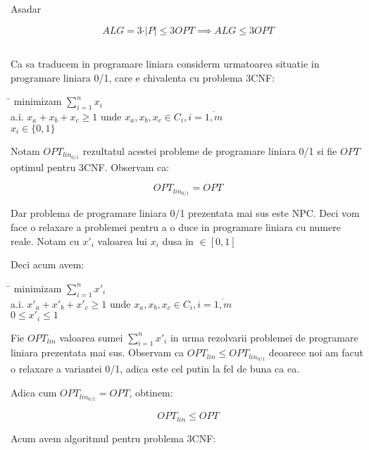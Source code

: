 \documentclass[a4paper]{report} %
\begin{document}
Asadar

\[ALG=3\cdot \vert P\vert \leq 3OPT \implies ALG\leq 3OPT\]

\subsection{}
Ca sa traducem in programare liniara considerm urmatoarea situatie in programare liniara 0/1, care e chivalenta cu problema 3CNF:

\begin{tabbing}
\hspace{2em}\= \kill 
minimizam $\sum_{i=1}^{n}x_{i}$ \\
a.i. \> $x_{a}+x_{b}+x_{c}\geq 1 \text{ unde } x_{a},x_{b},x_{c}\in C_{i}, i=\overline{1,m}$ \\
\> $x_{i}\in \{0, 1\}$
\end{tabbing}
Notam $OPT_{lin_{0/1}}$ rezultatul acestei probleme de programare liniara 0/1 si fie $OPT$ optimul pentru 3CNF. Observam ca:

\[OPT_{lin_{0/1}}=OPT\]

Dar problema de programare liniara 0/1 prezentata mai sus este NPC. Deci vom face o relaxare a problemei pentru a o duce in programare liniara cu numere reale. 
Notam cu $x'_{i}$ valoarea lui $x_{i}$ dusa in $\in [0,1]$

Deci acum avem:

\begin{tabbing}
\hspace{2em}\= \kill 
minimizam $\sum_{i=1}^{n}x'_{i}$ \\
a.i. \> $x'_{a}+x'_{b}+x'_{c}\geq 1 \text{ unde } x_{a},x_{b},x_{c}\in C_{i}, i=\overline{1,m}$ \\
\> $0\leq x'_{i}\leq 1$
\end{tabbing}

Fie $OPT_{lin}$ valoarea sumei $\sum_{i=1}^{n}x'_{i}$ in urma rezolvarii problemei de programare liniara prezentata mai sus.
Observam ca $OPT_{lin}\leq OPT_{lin_{0/1}}$ deoarece noi am facut o relaxare a variantei 0/1, adica este cel putin la fel de buna ca ea.

Adica cum $OPT_{lin_{0/1}}=OPT$, obtinem:

\[OPT_{lin}\leq OPT\]

Acum avem algoritmul pentru problema 3CNF:
\end{document}
